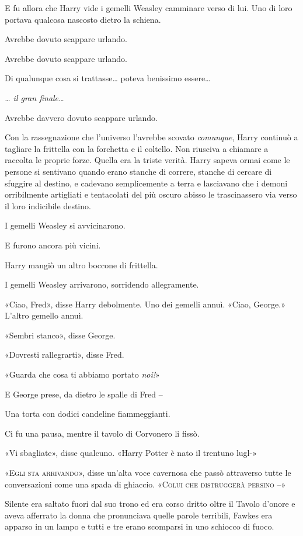 E fu allora che Harry vide i gemelli Weasley camminare verso di lui. Uno di loro portava qualcosa nascosto dietro la schiena.

Avrebbe dovuto scappare urlando.

Avrebbe dovuto scappare urlando.

Di qualunque cosa si trattasse… poteva benissimo essere…

\textit{… il gran finale…}

Avrebbe davvero dovuto scappare urlando.

Con la rassegnazione che l’universo l'avrebbe scovato \textit{comunque}, Harry continuò a tagliare la frittella con la forchetta e il coltello. Non riusciva a chiamare a raccolta le proprie forze. Quella era la triste verità. Harry sapeva ormai come le persone si sentivano quando erano stanche di correre, stanche di cercare di sfuggire al destino, e cadevano semplicemente a terra e lasciavano che i demoni orribilmente artigliati e tentacolati del più oscuro abisso le trascinassero via verso il loro indicibile destino.

I gemelli Weasley si avvicinarono.

E furono ancora più vicini.

Harry mangiò un altro boccone di frittella.

I gemelli Weasley arrivarono, sorridendo allegramente.

«Ciao, Fred», disse Harry debolmente. Uno dei gemelli annuì. «Ciao, George.» L’altro gemello annuì.

«Sembri stanco», disse George.

«Dovresti rallegrarti», disse Fred.

«Guarda che cosa ti abbiamo portato \textit{noi!}»

E George prese, da dietro le spalle di Fred –

Una torta con dodici candeline fiammeggianti.

Ci fu una pausa, mentre il tavolo di Corvonero li fissò.

«Vi sbagliate», disse qualcuno. «Harry Potter è nato il trentuno lugl-»

«\textsc{Egli sta arrivando}», disse un’alta voce cavernosa che passò attraverso tutte le conversazioni come una spada di ghiaccio. «\textsc{Colui che distruggerà persino} –»

Silente era saltato fuori dal suo trono ed era corso dritto oltre il Tavolo d’onore e aveva afferrato la donna che pronunciava quelle parole terribili, Fawkes era apparso in un lampo e tutti e tre erano scomparsi in uno schiocco di fuoco.

